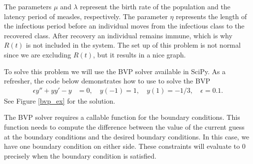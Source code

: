 The parameters $\mu$ and $\lambda$ represent the birth rate of the population and the latency period of measles, respectively.
The parameter $\eta$ represents the length of the infectious period before an individual moves from the infectious class to the recovered class.
After recovery an individual remains immune, which is why $R(t)$ is not included in the system.
The set up of this problem is not normal since we are excluding $R(t)$, but it results in a nice graph.

To solve this problem we will use the BVP solver available in SciPy.
As a refresher, the code below demonstrates how to use  to solve the BVP
\begin{align}\label{simple_bvp}
	\epsilon y'' + yy' - y &= 0, \quad y(-1) = 1, \quad y(1) = -1/3, \quad \epsilon=0.1.
\end{align}
See Figure \ref{bvp_ex} for the solution.

The BVP solver requires a callable function for the boundary conditions.
This function needs to compute the difference between the value of the current guess at the boundary conditions and the desired boundary conditions.
In this case, we have one boundary condition on either side.
These constraints will evaluate to 0 precisely when the boundary condition is satisfied.

